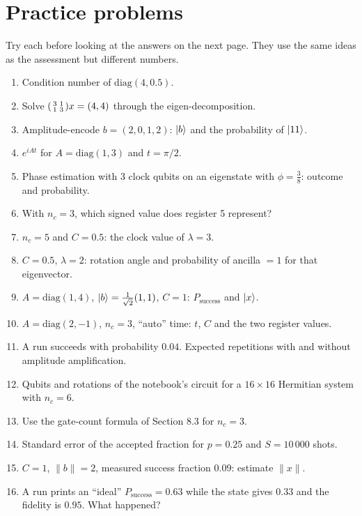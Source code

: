 \documentclass[11pt,a4paper,openany]{book}
\begin{document}
\section{Practice problems}
Try each before looking at the answers on the next page. They use the same ideas as the assessment but different numbers.
\begin{enumerate}[label=\textbf{P\arabic*.}, leftmargin=2.6em, itemsep=3pt]
\item Condition number of $\mathrm{diag}(4, 0.5)$.
\item Solve $\begin{psmallmatrix}3&1\\1&3\end{psmallmatrix}x = (4, 4)$ through the eigen-decomposition.
\item Amplitude-encode $b = (2, 0, 1, 2)$: $\ket b$ and the probability of $\ket{11}$.
\item $e^{iAt}$ for $A = \mathrm{diag}(1, 3)$ and $t = \pi/2$.
\item Phase estimation with 3 clock qubits on an eigenstate with $\phi = \frac38$: outcome and probability.
\item With $n_c = 3$, which signed value does register 5 represent?
\item $n_c = 5$ and $C = 0.5$: the clock value of $\lambda = 3$.
\item $C = 0.5$, $\lambda = 2$: rotation angle and probability of ancilla $= 1$ for that eigenvector.
\item $A = \mathrm{diag}(1, 4)$, $\ket b = \frac{1}{\sqrt2}(1, 1)$, $C = 1$: $P_{\text{success}}$ and $\ket x$.
\item $A = \mathrm{diag}(2, -1)$, $n_c = 3$, ``auto'' time: $t$, $C$ and the two register values.
\item A run succeeds with probability $0.04$. Expected repetitions with and without amplitude amplification.
\item Qubits and rotations of the notebook's circuit for a $16\times16$ Hermitian system with $n_c = 6$.
\item Use the gate-count formula of Section 8.3 for $n_c = 3$.
\item Standard error of the accepted fraction for $p = 0.25$ and $S = 10\,000$ shots.
\item $C = 1$, $\|b\| = 2$, measured success fraction $0.09$: estimate $\|x\|$.
\item A run prints an ``ideal'' $P_{\text{success}} = 0.63$ while the state gives $0.33$ and the fidelity is $0.95$. What happened?
\end{enumerate}
\end{document}
